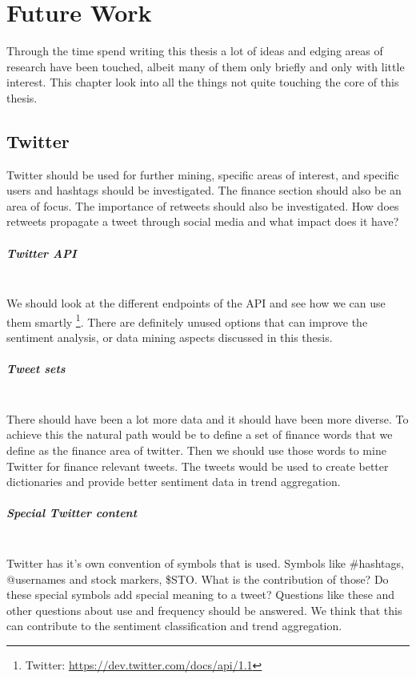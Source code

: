 \chapter{Future Work}\label{future_work}
Through the time spend writing this thesis a lot of ideas and edging areas of
research have been touched, albeit many of them only briefly and only with
little interest. This chapter look into all the things not
quite touching the core of this thesis.
%

\section{Twitter}\label{future_work:twitter}
Twitter should be used for further mining, specific areas of interest, and
specific users and hashtags should be investigated. 
The finance section should also be an area of focus. 
The importance of retweets should also be investigated. How does retweets
propagate a tweet through social media and what impact does it have?

\paragraph{Twitter API}
\hspace{0pt}\\
We should look at the different endpoints of the API and see how we can
use them smartly \footnote{Twitter: \url{https://dev.twitter.com/docs/api/1.1}}.
There are definitely unused options that can improve the sentiment analysis, or
data mining aspects discussed in this thesis. 

\paragraph{Tweet sets}
\hspace{0pt}\\
There should have been a lot more data and it should have been more diverse. To
achieve this the natural path would be to define a set of finance words that we
define as the finance area of twitter. Then we should use those words to mine
Twitter for finance relevant tweets. The tweets would be used to create better
dictionaries and provide better sentiment data in trend aggregation. 

\paragraph{Special Twitter content}
\hspace{0pt}\\
Twitter has it's own convention of symbols that is used. Symbols like \#hashtags,
@usernames and stock markers, \$STO. What is the contribution of those? Do these
special symbols add special meaning to a tweet? Questions like these and other
questions about use and frequency should be answered. We think that this can
contribute to the sentiment classification and trend aggregation. 

